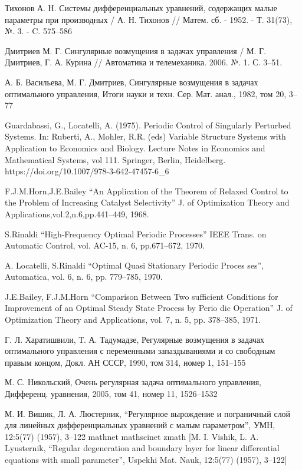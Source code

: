 \documentclass[../main.tex]{subfiles}
\begin{document}
\begin{thebibliography}{99}
Тихонов А. Н. Системы дифференциальных уравнений, содержащих малые параметры при производных / А. Н. Тихонов // Матем. сб. - 1952. - Т. 31(73), №.
3. - C. 575–586

Дмитриев М. Г. Сингулярные возмущения в задачах управления / М. Г. Дмитриев, Г. А. Курина // Автоматика и телемеханика.  2006.  №. 1.  С. 3–51.

А. Б. Васильева, М. Г. Дмитриев, Сингулярные возмущения в задачах оптимального управления, Итоги науки и техн. Сер. Мат. анал., 1982, том 20, 3–77

Guardabassi, G., Locatelli, A. (1975). Periodic Control of Singularly Perturbed Systems. In: Ruberti, A., Mohler, R.R. (eds) Variable Structure Systems with Application to Economics and Biology. Lecture Notes in Economics and Mathematical Systems, vol 111. Springer, Berlin, Heidelberg. https://doi.org/10.1007/978-3-642-47457-6\_6

F.J.M.Horn,J.E.Bailey “An Application of the Theorem of Relaxed Control to the Problem of Increasing Catalyst Selectivity” J. of Optimization Theory and Applications,vol.2,n.6,pp.441–449, 1968.

S.Rinaldi “High-Frequency Optimal Periodic Processes” IEEE Trans. on Automatic Control, vol. AC-15, n. 6, pp.671–672, 1970.

A. Locatelli, S.Rinaldi “Optimal Quasi Stationary Periodic Proces ses”, Automatica, vol. 6, n. 6, pp. 779–785, 1970.

J.E.Bailey, F.J.M.Horn “Comparison Between Two sufficient Conditions for Improvement of an Optimal Steady State Process by Perio dic Operation” J. of Optimization Theory and Applications, vol. 7, n. 5, pp. 378–385, 1971.

Г. Л. Харатишвили, Т. А. Тадумадзе, Регулярные возмущения в задачах оптимального управления с переменными запаздываниями и со свободным правым концом, Докл. АН СССР, 1990, том 314, номер 1, 151–155

М. С. Никольский, Очень регулярная задача оптимального управления, Дифференц. уравнения, 2005, том 41, номер 11, 1526–1532

М. И. Вишик, Л. А. Люстерник, “Регулярное вырождение и пограничный слой для линейных дифференциальных уравнений с малым параметром”, УМН, 12:5(77) (1957), 3–122  mathnet  mathscinet  zmath [M. I. Vishik, L. A. Lyusternik, “Regular degeneration and boundary layer for linear differential equations with small parameter”, Uspekhi Mat. Nauk, 12:5(77) (1957), 3–122]


\end{thebibliography}
\end{document}
